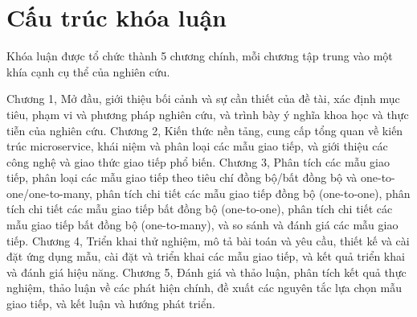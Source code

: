 \section{Cấu trúc khóa luận}
Khóa luận được tổ chức thành 5 chương chính, mỗi chương tập trung vào một khía cạnh cụ thể của nghiên cứu. 

Chương 1, Mở đầu, giới thiệu bối
cảnh và sự cần thiết của đề tài, xác định mục tiêu, phạm vi và phương pháp
nghiên cứu, và trình bày ý nghĩa khoa học và thực tiễn của nghiên cứu. Chương 2, Kiến thức nền tảng, cung cấp tổng quan về kiến trúc microservice, khái niệm và
phân loại các mẫu giao tiếp, và giới thiệu các công nghệ và giao thức giao tiếp
phổ biến. Chương 3, Phân tích các mẫu giao tiếp, phân loại các mẫu giao tiếp
theo tiêu chí đồng bộ/bất đồng bộ và one-to-one/one-to-many, phân tích chi tiết
các mẫu giao tiếp đồng bộ (one-to-one), phân tích chi tiết các mẫu giao tiếp
bất đồng bộ (one-to-one), phân tích chi tiết các mẫu giao tiếp bất đồng bộ
(one-to-many), và so sánh và đánh giá các mẫu giao tiếp. Chương 4, Triển khai
thử nghiệm, mô tả bài toán và yêu cầu, thiết kế và cài đặt ứng dụng mẫu, cài
đặt và triển khai các mẫu giao tiếp, và kết quả triển khai và đánh giá hiệu
năng. Chương 5, Đánh giá và thảo luận, phân tích kết quả thực nghiệm, thảo luận
về các phát hiện chính, đề xuất các nguyên tắc lựa chọn mẫu giao tiếp, và kết
luận và hướng phát triển.